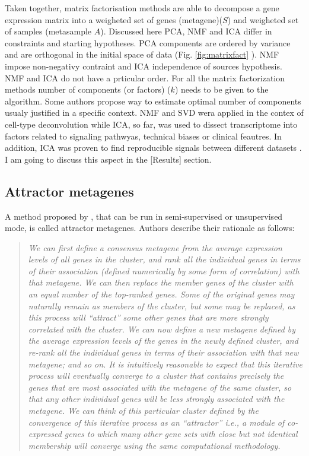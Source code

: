 \documentclass[12pt,]{book}
\theoremstyle{definition}
\theoremstyle{definition}
\theoremstyle{definition}
\theoremstyle{remark}
\begin{document}
Taken together, matrix factorisation methods are able to decompose a
gene expression matrix into a weigheted set of genes (metagene)(\(S\))
and weigheted set of samples (metasample \(A\)). Discussed here PCA, NMF
and ICA differ in constraints and starting hypotheses. PCA components
are ordered by variance and are orthogonal in the initial space of data
(Fig. \ref{fig:matrixfact} ). NMF impose non-negativy contraint and ICA
independence of sources hypothesis. NMF and ICA do not have a prticular
order. For all the matrix factorization methods number of components (or
factors) (\(k\)) needs to be given to the algorithm. Some authors
propose way to estimate optimal number of components usualy justified in
a specific context. NMF and SVD wera applied in the contex of cell-type
deconvolution while ICA, so far, was used to dissect transcriptome into
factors related to signaling pathwyas, technical biases or clinical
feautres. In addition, ICA was proven to find reproducible signals
between different datasets \citep{Cantini2018, Teschendorff2007}. I am
going to discuss this aspect in the {[}Results{]} section.

\hypertarget{attractor-metagenes}{%
\subsection{Attractor metagenes}\label{attractor-metagenes}}

A method proposed by \citet{Cheng2013}, that can be run in
semi-supervised or unsupervised mode, is called attractor metagenes.
Authors describe their rationale as follows:

\begin{quote}
\emph{We can first define a consensus metagene from the average
expression levels of all genes in the cluster, and rank all the
individual genes in terms of their association (defined numerically by
some form of correlation) with that metagene. We can then replace the
member genes of the cluster with an equal number of the top-ranked
genes. Some of the original genes may naturally remain as members of the
cluster, but some may be replaced, as this process will ``attract'' some
other genes that are more strongly correlated with the cluster. We can
now define a new metagene defined by the average expression levels of
the genes in the newly defined cluster, and re-rank all the individual
genes in terms of their association with that new metagene; and so on.
It is intuitively reasonable to expect that this iterative process will
eventually converge to a cluster that contains precisely the genes that
are most associated with the metagene of the same cluster, so that any
other individual genes will be less strongly associated with the
metagene. We can think of this particular cluster defined by the
convergence of this iterative process as an ``attractor'' i.e., a module
of co-expressed genes to which many other gene sets with close but not
identical membership will converge using the same computational
methodology.}
\end{quote}
\end{document}
